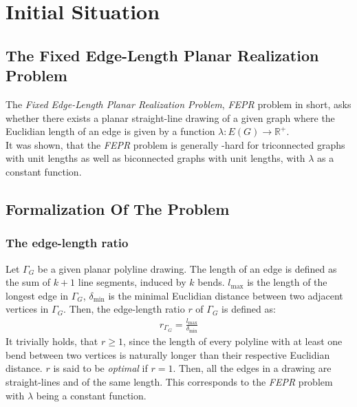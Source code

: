 \section{Initial Situation}\label{section:initial_situation}

\subsection{The Fixed Edge-Length Planar Realization Problem}

The \emph{Fixed Edge-Length Planar Realization Problem}, \emph{FEPR} problem in short, asks whether there exists a planar straight-line drawing of a given graph where the Euclidian length of an edge is given by a function $\lambda: E(G) \to \mathbb{R}^+$.
\\
It was shown, that the \emph{FEPR} problem is generally \NP-hard for triconnected graphs with unit lengths as well as biconnected graphs with unit lengths, with $\lambda$ as a constant function. \cite[P. 2]{straight-line_2-trees}

\subsection{Formalization Of The Problem}
\subsubsection{The edge-length ratio}
Let $\Gamma_G$ be a given planar polyline drawing. The length of an edge is defined as the sum of $k+1$ line segments, induced by $k$ bends. $l_{\max}$ is the length of the longest edge in $\Gamma_G$, $\delta_{\min}$ is the minimal Euclidian distance between two adjacent vertices in $\Gamma_G$. Then, the edge-length ratio $r$ of $\Gamma_G$ is defined as:
\begin{align}
	r_{\Gamma_G} = \frac{l_{\max}}{\delta_{\min}} 
\end{align}
It trivially holds, that $r\geq1$, since the length of every polyline with at least one bend between two vertices is naturally longer than their respective Euclidian distance. $r$ is said to be \emph{optimal} if $r=1$. Then, all the edges in a drawing are straight-lines and of the same length. This corresponds to the \emph{FEPR} problem with $\lambda$ being a constant function.
